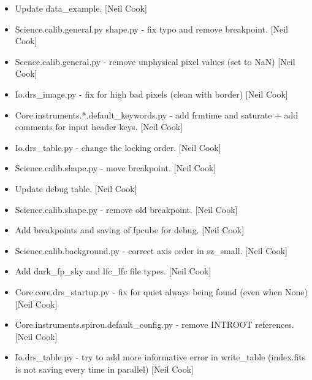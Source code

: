 \documentclass[a4paper,10pt,english]{report}
\begin{document}
\begin{itemize}
\item {} 
Update data\_example. {[}Neil Cook{]}

\item {} 
Science.calib.general.py shape.py - fix typo and remove breakpoint.
{[}Neil Cook{]}

\item {} 
Scence.calib.general.py - remove unphysical pixel values (set to NaN)
{[}Neil Cook{]}

\item {} 
Io.drs\_image.py - fix for high bad pixels (clean with border) {[}Neil
Cook{]}

\item {} 
Core.instruments.*.default\_keywords.py - add frmtime and saturate +
add comments for input header keys. {[}Neil Cook{]}

\item {} 
Io.drs\_table.py - change the locking order. {[}Neil Cook{]}

\item {} 
Science.calib.shape.py - move breakpoint. {[}Neil Cook{]}

\item {} 
Update debug table. {[}Neil Cook{]}

\item {} 
Science.calib.shape.py - remove old breakpoint. {[}Neil Cook{]}

\item {} 
Add breakpoints and saving of fpcube for debug. {[}Neil Cook{]}

\item {} 
Science.calib.background.py - correct axis order in sz\_small. {[}Neil
Cook{]}

\item {} 
Add dark\_fp\_sky and lfc\_lfc file types. {[}Neil Cook{]}

\item {} 
Core.core.drs\_startup.py - fix for quiet always being found (even when
None) {[}Neil Cook{]}

\item {} 
Core.instruments.spirou.default\_config.py - remove INTROOT references.
{[}Neil Cook{]}

\item {} 
Io.drs\_table.py - try to add more informative error in write\_table
(index.fits is not saving every time in parallel) {[}Neil Cook{]}

\end{itemize}
\end{document}
